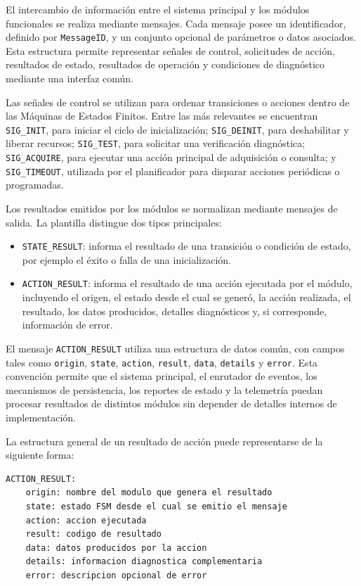 El intercambio de información entre el sistema principal y los módulos funcionales se realiza mediante mensajes. Cada mensaje posee un identificador, definido por \texttt{MessageID}, y un conjunto opcional de parámetros o datos asociados. Esta estructura permite representar señales de control, solicitudes de acción, resultados de estado, resultados de operación y condiciones de diagnóstico mediante una interfaz común.

Las señales de control se utilizan para ordenar transiciones o acciones dentro de las Máquinas de Estados Finitos. Entre las más relevantes se encuentran \texttt{SIG\_INIT}, para iniciar el ciclo de inicialización; \texttt{SIG\_DEINIT}, para deshabilitar y liberar recursos; \texttt{SIG\_TEST}, para solicitar una verificación diagnóstica; \texttt{SIG\_ACQUIRE}, para ejecutar una acción principal de adquisición o consulta; y \texttt{SIG\_TIMEOUT}, utilizada por el planificador para disparar acciones periódicas o programadas.

Los resultados emitidos por los módulos se normalizan mediante mensajes de salida. La plantilla distingue dos tipos principales:

\begin{itemize}
    \item \texttt{STATE\_RESULT}: informa el resultado de una transición o condición de estado, por ejemplo el éxito o falla de una inicialización.

    \item \texttt{ACTION\_RESULT}: informa el resultado de una acción ejecutada por el módulo, incluyendo el origen, el estado desde el cual se generó, la acción realizada, el resultado, los datos producidos, detalles diagnósticos y, si corresponde, información de error.
\end{itemize}

El mensaje \texttt{ACTION\_RESULT} utiliza una estructura de datos común, con campos tales como \texttt{origin}, \texttt{state}, \texttt{action}, \texttt{result}, \texttt{data}, \texttt{details} y \texttt{error}. Esta convención permite que el sistema principal, el enrutador de eventos, los mecanismos de persistencia, los reportes de estado y la telemetría puedan procesar resultados de distintos módulos sin depender de detalles internos de implementación.

La estructura general de un resultado de acción puede representarse de la siguiente forma:

\begin{verbatim}
ACTION_RESULT:
    origin: nombre del modulo que genera el resultado
    state: estado FSM desde el cual se emitio el mensaje
    action: accion ejecutada
    result: codigo de resultado
    data: datos producidos por la accion
    details: informacion diagnostica complementaria
    error: descripcion opcional de error
\end{verbatim}


